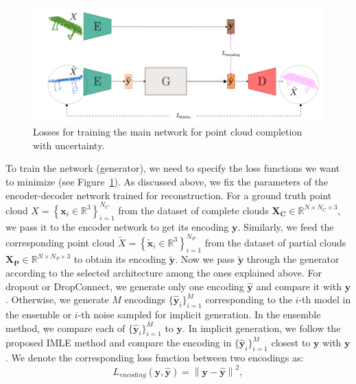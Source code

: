         \begin{figure}[htb]
          \begin{center}
          \includegraphics[width=\linewidth]{figures/losses_main_network.png}
          \end{center}
          \caption{Losses for training the main network for point cloud completion with uncertainty.}\label{fig:losses_main}
        \end{figure}
        To train the network (generator), we need to specify the loss functions we want to minimize (see Figure~\ref{fig:losses_main}). As discussed above, we fix the parameters of the encoder-decoder network trained for reconstruction. For a ground truth point cloud $X=\left\{\mathbf{x}_{i} \in \mathbb{R}^{3}\right\}_{i=1}^{N_C}$ from the dataset of complete clouds $\mathbf{X_C} \in \mathbb{R}^{N \times N_C \times 3}$, we pass it to the encoder network to get its encoding $\mathbf{y}$. Similarly, we feed the corresponding point cloud $\tilde{X}=\left\{\mathbf{\tilde{x}}_{i} \in \mathbb{R}^{3}\right\}_{i=1}^{N_P}$ from the dataset of partial clouds $\mathbf{X_P} \in \mathbb{R}^{N \times N_P \times 3}$ to obtain its encoding $\mathbf{\tilde{y}}$. Now we pass $\mathbf{\tilde{y}}$ through the generator according to the selected architecture among the ones explained above. For dropout or DropConnect, we generate only one encoding $\mathbf{\hat{y}}$ and compare it with $\mathbf{y}$. Otherwise, we generate $M$ encodings $\{\mathbf{\hat{y}}_i\}_{i=1}^M$ corresponding to the $i$-th model in the ensemble or $i$-th noise sampled for implicit generation. In the ensemble method, we compare each of $\{\mathbf{\hat{y}}_i\}_{i=1}^M$ to $\mathbf{y}$. In implicit generation, we follow the proposed IMLE method and compare the encoding in $\{\mathbf{\hat{y}}_i\}_{i=1}^M$ closest to $\mathbf{y}$ with $\mathbf{y}$. We denote the corresponding loss function between two encodings as:
        \begin{equation}\label{latent_loss}
            L_{encoding}(\mathbf{y}, \mathbf{\hat{y}}) = \left\|\mathbf{y} - \mathbf{\hat{y}}\right\|^2,
        \end{equation}

